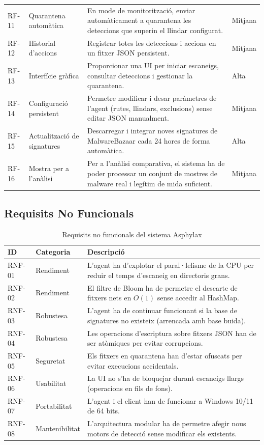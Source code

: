 \documentclass[12pt,a4paper]{report}
\begin{document}
\begin{table}[H]
\begin{tabular}{@{}llp{7.5cm}l@{}}
RF-11 & Quarantena automàtica      & En mode de monitorització, enviar automàticament a quarantena les deteccions que superin el llindar configurat. & Mitjana \\
RF-12 & Historial d'accions        & Registrar totes les deteccions i accions en un fitxer JSON persistent. & Mitjana \\
RF-13 & Interfície gràfica         & Proporcionar una UI per iniciar escaneigs, consultar deteccions i gestionar la quarantena. & Alta \\
RF-14 & Configuració persistent    & Permetre modificar i desar paràmetres de l'agent (rutes, llindars, exclusions) sense editar JSON manualment. & Mitjana \\
RF-15 & Actualització de signatures & Descarregar i integrar noves signatures de MalwareBazaar cada 24 hores de forma automàtica. & Alta \\
RF-16 & Mostra per a l'anàlisi     & Per a l'anàlisi comparativa, el sistema ha de poder processar un conjunt de mostres de malware real i legítim de mida suficient. & Mitjana \\
\bottomrule
\end{tabular}
\end{table}

\subsection{Requisits No Funcionals}

\begin{table}[H]
\centering
\caption{Requisits no funcionals del sistema Asphylax}
\label{tab:rnf}
\begin{tabular}{@{}llp{8cm}@{}}
\toprule
\textbf{ID} & \textbf{Categoria} & \textbf{Descripció} \\
\midrule
RNF-01 & Rendiment    & L'agent ha d'explotar el paral·lelisme de la CPU per reduir el temps d'escaneig en directoris grans. \\
RNF-02 & Rendiment    & El filtre de Bloom ha de permetre el descarte de fitxers nets en $O(1)$ sense accedir al HashMap. \\
RNF-03 & Robustesa    & L'agent ha de continuar funcionant si la base de signatures no existeix (arrencada amb base buida). \\
RNF-04 & Robustesa    & Les operacions d'escriptura sobre fitxers JSON han de ser atòmiques per evitar corrupcions. \\
RNF-05 & Seguretat    & Els fitxers en quarantena han d'estar ofuscats per evitar execucions accidentals. \\
RNF-06 & Usabilitat   & La UI no s'ha de bloquejar durant escaneigs llargs (operacions en fils de fons). \\
RNF-07 & Portabilitat & L'agent i el client han de funcionar a Windows 10/11 de 64 bits. \\
RNF-08 & Mantenibilitat & L'arquitectura modular ha de permetre afegir nous motors de detecció sense modificar els existents. \\
\bottomrule
\end{tabular}
\end{table}
\end{document}
